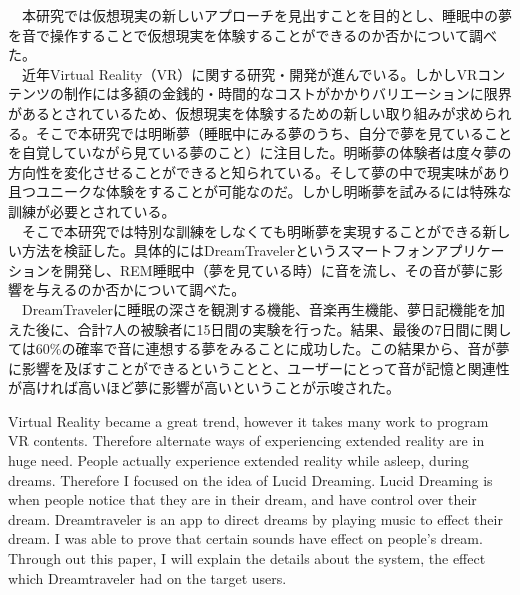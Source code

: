 
\begin{jabstract}
　本研究では仮想現実の新しいアプローチを見出すことを目的とし、睡眠中の夢を音で操作することで仮想現実を体験することができるのか否かについて調べた。\\
　近年Virtual Reality（VR）に関する研究・開発が進んでいる。しかしVRコンテンツの制作には多額の金銭的・時間的なコストがかかりバリエーションに限界があるとされているため、仮想現実を体験するための新しい取り組みが求められる。そこで本研究では明晰夢（睡眠中にみる夢のうち、自分で夢を見ていることを自覚していながら見ている夢のこと）に注目した。明晰夢の体験者は度々夢の方向性を変化させることができると知られている。そして夢の中で現実味があり且つユニークな体験をすることが可能なのだ。しかし明晰夢を試みるには特殊な訓練が必要とされている。\\
　そこで本研究では特別な訓練をしなくても明晰夢を実現することができる新しい方法を検証した。具体的にはDreamTravelerというスマートフォンアプリケーションを開発し、REM睡眠中（夢を見ている時）に音を流し、その音が夢に影響を与えるのか否かについて調べた。\\ 
　DreamTravelerに睡眠の深さを観測する機能、音楽再生機能、夢日記機能を加えた後に、合計7人の被験者に15日間の実験を行った。結果、最後の7日間に関しては60\%の確率で音に連想する夢をみることに成功した。この結果から、音が夢に影響を及ぼすことができるということと、ユーザーにとって音が記憶と関連性が高ければ高いほど夢に影響が高いということが示唆された。

\end{jabstract}

\begin{eabstract}
	Virtual Reality became a great trend, however it takes many work to program VR contents. Therefore alternate ways of experiencing extended reality are in huge need. People actually experience extended reality while asleep, during dreams. Therefore I focused on the idea of Lucid Dreaming. Lucid Dreaming is when people notice that they are in their dream, and have control over their dream. Dreamtraveler is an app to direct dreams by playing music to effect their dream. I was able to prove that certain sounds have effect on people's dream. Through out this paper, I will explain the details about the system, the effect which Dreamtraveler had on the target users.
\end{eabstract}